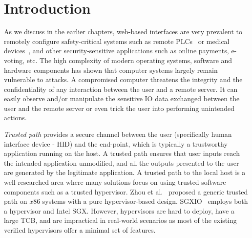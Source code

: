 \section{Introduction}
\label{sec:intro}

As we discuss in the earlier chapters, web-based interfaces are very prevalent to remotely configure safety-critical systems such as remote PLCs~\cite{controlbyweb,webplc,koyo} or medical devices~\cite{medicalDevice}, and other security-sensitive applications such as online payments, e-voting, etc. The high complexity of modern operating systems, software and hardware components has shown that computer systems largely remain vulnerable to attacks. A compromised computer threatens the integrity and the confidentiality of any interaction between the user and a remote server. It can easily observe and/or manipulate the sensitive IO data exchanged between the user and the remote server or even trick the user into performing unintended actions. 


\emph{Trusted path} provides a secure channel between the user (specifically human interface device - HID) and the end-point, which is typically a trustworthy application running on the host. A trusted path ensures that user inputs reach the intended application unmodified, and all the outputs presented to the user are generated by the legitimate application. A trusted path to the local host is a well-researched area where many solutions focus on using trusted software components such as a trusted hypervisor. Zhou et al.~\cite{zhou2012building} proposed a generic trusted path on $x86$ systems with a pure hypervisor-based design. SGXIO~\cite{weiser2017sgxio} employs both a hypervisor and Intel SGX. However, hypervisors are hard to deploy, have a large TCB, and are impractical in real-world scenarios as most of the existing verified hypervisors offer a minimal set of features. 

